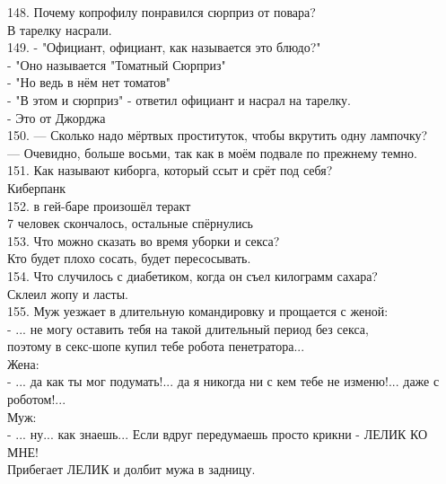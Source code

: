 \documentclass[a4paper,20pt,notitlepage]{extbook}
\begin{document}
	148. Почему копрофилу понравился сюрприз от повара?\\
	В тарелку насрали. \\
	
	149. - "Официант, официант, как называется это блюдо?"\\
	- "Оно называется "Томатный Сюрприз"\\
	- "Но ведь в нём нет томатов"\\
	- "В этом и сюрприз" - ответил официант и насрал на тарелку.\\
	- Это от Джорджа\\
	
	150. — Сколько надо мёртвых проституток, чтобы вкрутить одну лампочку?\\
	— Очевидно, больше восьми, так как в моём подвале по прежнему темно.\\
	
	151. Как называют киборга, который ссыт и срёт под себя?\\
	Киберпанк\\
	
	152. в гей-баре произошёл теракт\\
	7 человек скончалось, остальные спёрнулись\\
	
	153. Что можно сказать во время уборки и секса?\\
	Кто будет плохо сосать, будет пересосывать.\\
	
	154. Что случилось с диабетиком, когда он съел килограмм сахара?\\
	Склеил жопу и ласты.\\
	
	155. Муж уезжает в длительную командировку и прощается с женой:\\
	- ... не могу оставить тебя на такой длительный период без секса,\\
	поэтому в секс-шопе купил тебе робота пенетратора...\\
	Жена:\\
	- ... да как ты мог подумать!... да я никогда ни с кем тебе не изменю!...
	даже с роботом!...\\
	Муж:\\
	- ... ну... как знаешь... Если вдруг передумаешь просто крикни - ЛЕЛИК
	КО МНЕ!\\
	Прибегает ЛЕЛИК и долбит мужа в задницу.\\
	
\end{document}
